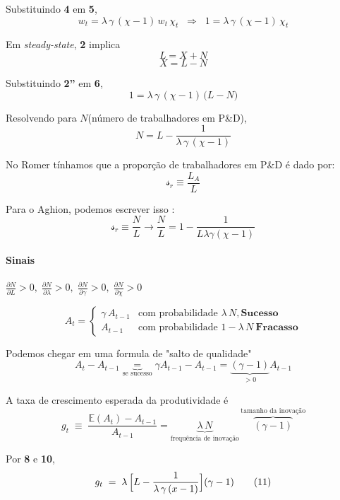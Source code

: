 \documentclass[a4paper,12pt]{article}[abntex2]
\begin{document}
\smallskip
Substituindo \textbf{4} em \textbf{5},
\[
 w_t = \lambda\,\gamma\,(\chi-1)\,w_t\,\chi_t
 \;\;\Longrightarrow\;\;
 1 = \lambda\,\gamma\,(\chi-1)\,\chi_t
 \tag{6}
\]

Em \emph{steady-state}, \textbf{2} implica
\[
 L = X + N \tag{2'}
\]
\[
 X = L - N \tag{2''}
\]

Substituindo \textbf{2''} em \textbf{6},
\[
 1 = \lambda\,\gamma\,(\chi-1)\,\bigl(L-N\bigr)
 \tag{7}
\]

Resolvendo para $N$(número de trabalhadores em P\&D),
\[
 N = L - \frac{1}{\lambda\,\gamma\,(\chi-1)}
 \tag{8}
\]

No Romer tínhamos que a proporção de trabalhadores em P\&D é dado por:
\[
\mathcal{s}_r\equiv\frac{L_A}{L}
\]

Para o Aghion, podemos escrever isso :
\[
\mathcal{s}_r\equiv\frac{N}{L}\rightarrow\frac{N}{L}=1-\frac{1}{L\lambda\gamma(\chi-1)}
\]

\paragraph{\textbf{Sinais}}\;
$\displaystyle
\frac{\partial N}{\partial L}>0,\;
\frac{\partial N}{\partial\lambda}>0,\;
\frac{\partial N}{\partial\gamma}>0,\;
\frac{\partial N}{\partial \chi}>0
$

\[
A_t =
\begin{cases}
\gamma\,A_{t-1} & \text{com probabilidade } \lambda\,N, \textbf{Sucesso}\\[4pt]
A_{t-1}         & \text{com probabilidade } 1-\lambda\,N \ \textbf{Fracasso}
\end{cases}
\tag{9}
\]

Podemos chegar em uma formula de "salto de qualidade"
\[
A_t-A_{t-1}\underbrace{=}_\text{se sucesso} \gamma A_{t-1}-A_{t-1}=\underbrace{(\gamma-1)}_{>0}A_{t-1}
\]

A taxa de crescimento esperada da produtividade é
\[
 g_t \;\equiv\;
 \frac{\mathbb{E}(A_t)-A_{t-1}}{A_{t-1}}
 = \underbrace{\lambda\,N}_\text{frequência de inovação}\,\overbrace{(\gamma-1)}^\text{tamanho da inovação}
 \tag{10}
\]

Por \textbf{8} e \textbf{10},
\[
 g_t \;=\;
 \lambda\,
 \Bigl[L - \dfrac{1}{\lambda\,\gamma\,(x-1)}\Bigr]
 (\gamma-1)
 \tag{11}
\]

\end{document}
